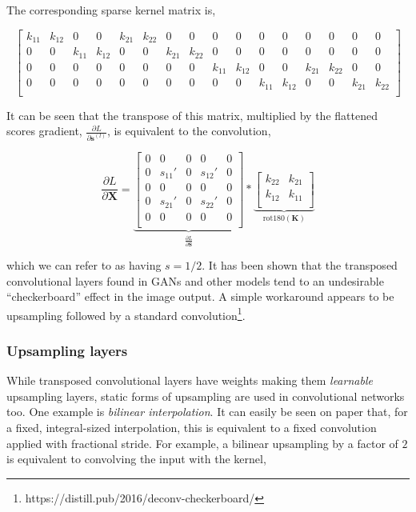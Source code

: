 The corresponding sparse kernel matrix is,

\setcounter{MaxMatrixCols}{20}

$$
\begin{bmatrix}
k_{11} & k_{12} & 0 & 0 & k_{21} & k_{22} & 0 & 0 & 0 & 0 & 0 & 0 & 0 & 0 & 0 & 0 \\
0 & 0 & k_{11} & k_{12} & 0 & 0 & k_{21} & k_{22} & 0 & 0 & 0 & 0 & 0 & 0 & 0 & 0 \\
0 & 0 & 0 & 0 & 0 & 0 & 0 & 0 & k_{11} & k_{12} & 0 & 0 & k_{21} & k_{22} & 0 & 0 \\
0 & 0 & 0 & 0 & 0 & 0 & 0 & 0 & 0 & 0 & k_{11} & k_{12} & 0 & 0 & k_{21} & k_{22} \\
\end{bmatrix}
$$

It can be seen that the transpose of this matrix, multiplied by the flattened scores gradient, $\frac{\partial L}{\partial \mathbf{s}^{(l)}}$, is equivalent to the convolution,

$$\frac{\partial L}{\partial \mathbf{X}}=
\underbrace{\begin{bmatrix}
0 & 0 & 0 & 0 & 0 \\
0 & s_{11}' & 0 & s_{12}' & 0 \\
0 & 0 & 0 & 0 & 0 \\
0 & s_{21}' & 0 & s_{22}' & 0 \\
0 & 0 & 0 & 0 & 0 \\
\end{bmatrix}}_{\frac{\partial L}{\partial \mathbf{S}}} * 
\underbrace{\begin{bmatrix}
k_{22} & k_{21} \\
k_{12} & k_{11} \\
\end{bmatrix}}_{\text{rot180}(\mathbf{K})}
$$

which we can refer to as having $s = 1/2$. It has been shown that the transposed convolutional layers found in GANs and other models tend to an undesirable ``checkerboard'' effect in the image output. A simple workaround appears to be upsampling followed by a standard convolution\footnote{https://distill.pub/2016/deconv-checkerboard/}.

\subsubsection{Upsampling layers}

While transposed convolutional layers have weights making them \emph{learnable} upsampling layers, static forms of upsampling are used in convolutional networks too. One example is \emph{bilinear interpolation}. It can easily be seen on paper that, for a fixed, integral-sized interpolation, this is equivalent to a fixed convolution applied with fractional stride. For example, a bilinear upsampling by a factor of $2$ is equivalent to convolving the input with the kernel,


